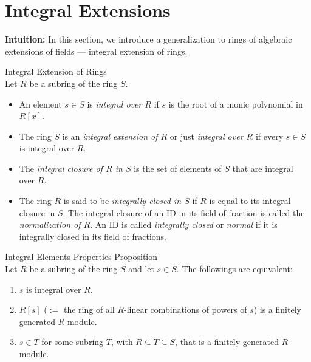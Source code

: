 \section{Integral Extensions}

\noindent\textbf{Intuition:} In this section, we introduce a generalization to rings of algebraic extensions of fields --- integral extension of rings.

\begin{definition}{Integral Extension of Rings}\\
Let $R$ be a subring of the ring $S$.
\begin{itemize}
    \item An element $s\in S$ is \textit{integral over $R$} if $s$ is the root of a monic polynomial in $R[x]$.
    \item The ring $S$ is an \textit{integral extension of $R$} or just \textit{integral over $R$} if every $s\in S$ is integral over $R$.
    \item The \textit{integral closure of $R$ in $S$} is the set of elements of $S$ that are integral over $R$.
    \item The ring $R$ is said to be \textit{integrally closed in $S$} if $R$ is equal to its integral closure in $S$. The integral closure of an ID in its field of fraction is called the \textit{normalization of $R$}. An ID is called \textit{integrally closed} or \textit{normal} if it is integrally closed in its field of fractions.
\end{itemize}
\end{definition}

\begin{proposition}{Integral Elements-Properties Proposition}\\
Let $R$ be a subring of the ring $S$ and let $s\in S$. The followings are equivalent:
\begin{enumerate}
    \item $s$ is integral over $R$.
    \item $R[s]$ ($:=$ the ring of all $R$-linear combinations of powers of $s$) is a finitely generated $R$-module.
    \item $s\in T$ for some subring $T$, with $R \subseteq T \subseteq S$, that is a finitely generated $R$-module.
\end{enumerate}
\end{proposition}

